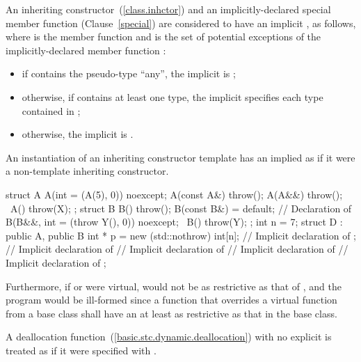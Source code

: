 \pnum
An inheriting constructor~(\ref{class.inhctor}) and an implicitly-declared
special member function (Clause~\ref{special}) are considered to have an
implicit , as follows, where  is
the member function and  is the set of potential exceptions of the
implicitly-declared member function :
\begin{itemize}
\item
if  contains the pseudo-type “any”, the implicit
 is ;
\item
otherwise, if  contains at least one type, the implicit
 specifies each type 
contained in ;
\item
otherwise, the implicit  is
.
\end{itemize}
    
\enternote An instantiation of an inheriting constructor template has
an implied  as if it were a non-template
inheriting constructor.\exitnote
\enterexample
\begin{codeblock}
struct A {
  A(int = (A(5), 0)) noexcept;
  A(const A&) throw();
  A(A&&) throw();
  ~A() throw(X);
};
struct B {
  B() throw();
  B(const B&) = default; // Declaration of 
  B(B&&, int = (throw Y(), 0)) noexcept;
  ~B() throw(Y);
};
int n = 7;
struct D : public A, public B {
    int * p = new (std::nothrow) int[n];
    // Implicit declaration of ;
    // Implicit declaration of 
    // Implicit declaration of 
    // Implicit declaration of 
    // Implicit declaration of 
};
\end{codeblock}

Furthermore, if
or
were virtual,
would not be as restrictive as that of
,
and the program would be ill-formed since a function that overrides a virtual
function from a base class shall have an 
 at least as restrictive as that in the base class.
\exitexample

\pnum
A deallocation function~(\ref{basic.stc.dynamic.deallocation}) with no explicit 
 is treated as if it were specified with
.

